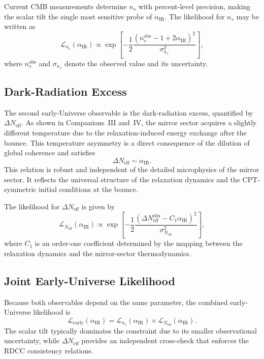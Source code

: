 \documentclass[11pt,a4paper]{article}
\begin{document}
Current CMB measurements determine $n_s$ with percent-level precision, making the scalar
tilt the single most sensitive probe of $\alpha_{\mathrm{IR}}$. The likelihood for $n_s$ may be written as
\begin{equation}
    \mathcal{L}_{n_s}(\alpha_{\mathrm{IR}}) \propto
    \exp\!\left[
        -\frac{1}{2}
        \frac{\left(n_s^{\mathrm{obs}} - 1 + 2\alpha_{\mathrm{IR}}\right)^2}
             {\sigma_{n_s}^2}
    \right],
\end{equation}
where $n_s^{\mathrm{obs}}$ and $\sigma_{n_s}$ denote the observed value and its uncertainty.

\subsection{Dark-Radiation Excess}

The second early-Universe observable is the dark-radiation excess, quantified by
$\Delta N_{\mathrm{eff}}$. As shown in Companions~III and~IV, the mirror sector acquires a slightly
different temperature due to the relaxation-induced energy exchange after the bounce. This
temperature asymmetry is a direct consequence of the dilution of global coherence and satisfies
\begin{equation}
    \Delta N_{\mathrm{eff}} \sim \alpha_{\mathrm{IR}}.
\end{equation}
This relation is robust and independent of the detailed microphysics of the mirror sector. It
reflects the universal structure of the relaxation dynamics and the CPT-symmetric initial
conditions at the bounce.

The likelihood for $\Delta N_{\mathrm{eff}}$ is given by
\begin{equation}
    \mathcal{L}_{N_{\mathrm{eff}}}(\alpha_{\mathrm{IR}}) \propto
    \exp\!\left[
        -\frac{1}{2}
        \frac{\left(\Delta N_{\mathrm{eff}}^{\mathrm{obs}} - C_1\alpha_{\mathrm{IR}}\right)^2}
             {\sigma_{N_{\mathrm{eff}}}^2}
    \right],
\end{equation}
where $C_1$ is an order-one coefficient determined by the mapping between the relaxation
dynamics and the mirror-sector thermodynamics.

\subsection{Joint Early-Universe Likelihood}

Because both observables depend on the same parameter, the combined early-Universe
likelihood is
\begin{equation}
    \mathcal{L}_{\mathrm{early}}(\alpha_{\mathrm{IR}})
    = \mathcal{L}_{n_s}(\alpha_{\mathrm{IR}})
      \times
      \mathcal{L}_{N_{\mathrm{eff}}}(\alpha_{\mathrm{IR}}).
\end{equation}
The scalar tilt typically dominates the constraint due to its smaller observational uncertainty,
while $\Delta N_{\mathrm{eff}}$ provides an independent cross-check that enforces the RDCC
consistency relations.
\end{document}
